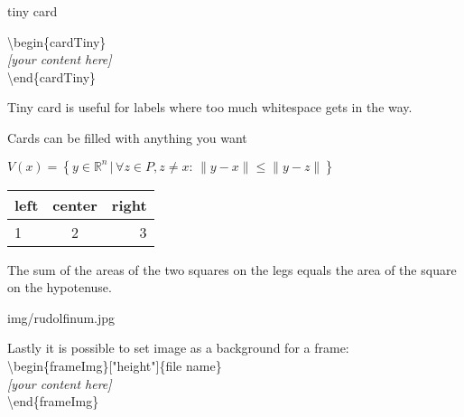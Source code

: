 \documentclass[aspectratio=43]{beamer}
\begin{document}
\begin{frame}{tiny card}
\begin{cardTiny}
\end{cardTiny}

\begin{card}
{\color{primary} \textbackslash begin\{cardTiny\}\\[2mm]}
\null\qquad \textit{[your content here]}\\[2mm]
{\color{primary} \textbackslash end\{cardTiny\}}
\end{card}
\begin{card}
Tiny card is useful for labels where too much whitespace gets in the way. 
\end{card}
\end{frame}

\begin{frame}{Cards can be filled with anything you want}

\begin{card}
\centering$V(x) = \left\{ y \in \mathbb{R}^n \,|\, \forall z \in P, z\neq x:\, \|y-x\|\leq\|y-z\| \right\}$
\end{card}

\begin{card}
\centering
\begin{tabular}{lcr}
left & center & right \\
\hline
1 & 2 & 3 \\
\end{tabular}
\end{card}

\begin{card}
\begin{theorem}[Pythagorean]
The sum of the areas of the two squares on the legs equals the area of the square on the hypotenuse.
\end{theorem}
\end{card}
\end{frame}

\begin{frameImg}{img/rudolfinum.jpg}
\vspace*{60mm}
\begin{cardTiny}
Lastly it is possible to set image as a background for a frame:\\[2mm]
{\color{primary} \textbackslash begin\{frameImg\}["height"]\{file name\}\\[2mm]}
\null\qquad \textit{[your content here]}\\[2mm]
{\color{primary} \textbackslash end\{frameImg\}}
\end{cardTiny}
\end{frameImg}
\end{document}
